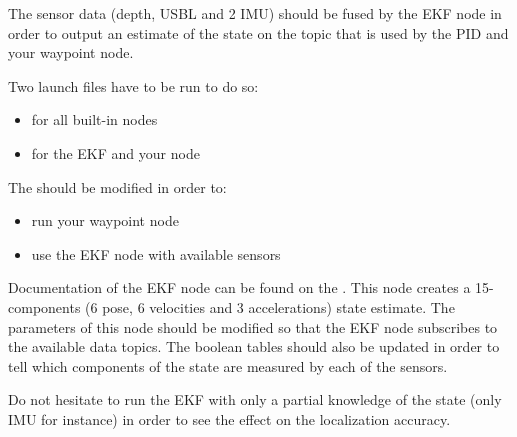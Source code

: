 \documentclass{ecnreport}
\begin{document}
The sensor data (depth, USBL and 2 IMU) should be fused by the EKF node in order to output an estimate of the state on the  topic that is used by the PID and your waypoint node.

Two launch files have to be run to do so:
\begin{itemize}
 \item {} for all built-in nodes
 \item {} for the EKF and your node
\end{itemize}

The  should be modified in order to:
\begin{itemize}
 \item run your waypoint node
 \item use the EKF node with available sensors
\end{itemize}
Documentation of the EKF node can be found on the .
This node creates a 15-components (6 pose, 6 velocities and 3 accelerations) state estimate.
The parameters of this node should be modified so that the EKF node
subscribes to the available data topics. The boolean tables should
also be updated in order to tell which components of the state are measured by each of the sensors. 

Do not hesitate to run the EKF with only a partial knowledge of the state (only IMU for instance) in order to see the effect on the localization accuracy.
\end{document}

